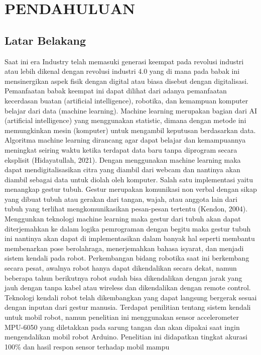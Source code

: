 \section{PENDAHULUAN}

\subsection{Latar Belakang}

Saat ini era Industry telah memasuki generasi keempat pada revolusi industri atau lebih dikenal dengan revolusi industri 4.0 yang di mana pada babak ini mensinergikan aspek fisik dengan digital atau biasa disebut dengan digitalisasi. Pemanfaatan babak keempat ini dapat dilihat dari adanya pemanfaatan kecerdasan buatan (artificial intelligence), robotika, dan kemampuan komputer belajar dari data (machine learning). Machine learning merupakan bagian dari AI (artificial intelligence) yang menggunakan statistic, dimana dengan metode ini memungkinkan mesin (komputer) untuk mengambil keputusan berdasarkan data. Algoritma machine learning dirancang agar dapat belajar dan kemampuannya meningkat seiring waktu ketika terdapat data baru tanpa diprogram secara eksplisit (Hidayatullah, 2021). Dengan menggunakan machine learning maka dapat mendigitalisasikan citra yang diambil dari webcam dan nantinya akan diambil sebagai data untuk diolah oleh komputer. Salah satu implementasi yaitu menangkap gestur tubuh. Gestur merupakan komunikasi non verbal dengan sikap yang dibuat tubuh atau gerakan dari tangan, wajah, atau anggota lain dari tubuh yang terlihat mengkomunikasikan pesan-pesan tertentu (Kendon, 2004). Menggunkan teknologi machine learning maka gestur dari tubuh akan dapat diterjemahkan ke dalam logika pemrograman dengan begitu maka gestur tubuh ini nantinya akan dapat di implementasikan dalam banyak hal seperti membantu membenarkan pose berolahraga, menerjemahkan bahasa isyarat, dan menjadi sistem kendali pada robot. Perkembangan bidang robotika saat ini berkembang secara pesat, awalnya robot hanya dapat dikendalikan secara dekat, namun beberapa tahun berikutnya robot sudah bisa dikendalikan dengan jarak yang jauh dengan tanpa kabel atau wireless dan dikendalikan dengan remote control. Teknologi kendali robot telah dikembangkan yang dapat langsung bergerak sesuai dengan inputan dari gestur manusia. Terdapat penilitian tentang sistem kendali untuk mobil robot, namun penelitian ini menggunakan sensor accelerometer MPU-6050 yang diletakkan pada sarung tangan dan akan dipakai saat ingin mengendalikan mobil robot Arduino. Penelitian ini didapatkan tingkat akurasi 100\% dan hasil respon sensor terhadap mobil mampu

